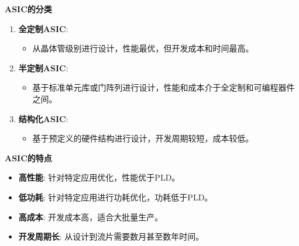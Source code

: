 \documentclass[
  ignorenonframetext,
  chinese,
]{beamer}
\providecommand{\tightlist}{%
  \setlength{\itemsep}{0pt}\setlength{\parskip}{0pt}}
\begin{document}
\begin{frame}
\begin{block}{\textbf{ASIC的分类}}
\label{asicux7684ux5206ux7c7b}
\begin{enumerate}
\tightlist
\item
  \textbf{全定制ASIC}:

  \begin{itemize}
  \tightlist
  \item
    从晶体管级别进行设计，性能最优，但开发成本和时间最高。\\
  \end{itemize}
\item
  \textbf{半定制ASIC}:

  \begin{itemize}
  \tightlist
  \item
    基于标准单元库或门阵列进行设计，性能和成本介于全定制和可编程器件之间。\\
  \end{itemize}
\item
  \textbf{结构化ASIC}:

  \begin{itemize}
  \tightlist
  \item
    基于预定义的硬件结构进行设计，开发周期较短，成本较低。
  \end{itemize}
\end{enumerate}
\end{block}
\end{frame}

\begin{frame}
\begin{block}{\textbf{ASIC的特点}}
\label{asicux7684ux7279ux70b9}
\begin{itemize}
\tightlist
\item
  \textbf{高性能}: 针对特定应用优化，性能优于PLD。\\
\item
  \textbf{低功耗}: 针对特定应用进行功耗优化，功耗低于PLD。\\
\item
  \textbf{高成本}: 开发成本高，适合大批量生产。\\
\item
  \textbf{开发周期长}: 从设计到流片需要数月甚至数年时间。
\end{itemize}
\end{block}
\end{frame}
\end{document}
